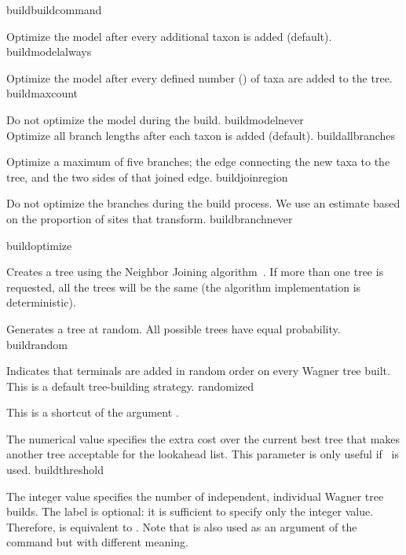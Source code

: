\begin{command}{build}{buildcommand}
\begin{arguments}
{\begin{description}

{Optimize the model after every additional taxon is added (default).}
{buildmodelalways}

{Optimize the model after every defined number (\poyint) of taxa
are added to the tree.} 
{buildmaxcount}

{Do not optimize the model during the build.}
{buildmodelnever}
\\
{Optimize all branch lengths after each taxon is added (default).}
{buildallbranches}

{Optimize a maximum of five branches; the edge connecting
the new taxa to the tree, and the two sides of that joined
edge.}
{buildjoinregion}

{Do not optimize the branches during the build process. We use
an estimate based on the proportion of sites that transform.}
{buildbranchnever}

\end{description}
}
{buildoptimize}

{Creates a tree using the Neighbor Joining algorithm~\cite{saitou1987}.
If more than one tree is requested, all the trees will be the same
(the algorithm implementation is deterministic).}{}

{Generates a tree at random. All possible trees have equal probability.}
{buildrandom}

{Indicates that terminals are added in random order on every Wagner
tree built. This is a default tree-building strategy.} 
{randomized}

{This is a shortcut of the argument .}
{}

{The numerical value specifies the extra cost over the current best
tree that makes another tree acceptable for the lookahead list. This 
parameter is only useful if~ is used.}
{buildthreshold}

{The integer value specifies the number of independent, individual
Wagner tree builds. The label  is optional: it
is sufficient to specify only the integer value. Therefore,
 is equivalent to .
Note that  is also used as an argument of the
command  but with different meaning.

}
\end{arguments}
\end{command}

